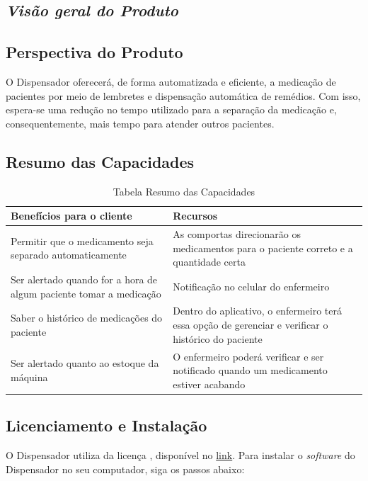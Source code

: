 \begin{apendicesenv}
\section{\textit{Visão geral do Produto}}
\subsection*{Perspectiva do Produto}

O Dispensador oferecerá, de forma automatizada e eficiente, a medicação de pacientes por meio de lembretes e dispensação automática de remédios. Com isso, espera-se uma redução no tempo utilizado para a separação da medicação e, consequentemente, mais tempo para atender outros pacientes.

\subsection*{Resumo das Capacidades}

\begin{table}[H]
    \centering
    \caption{Tabela Resumo das Capacidades}
    \begin{tabularx}{\textwidth}{|G{7.5cm}|G{7.5cm}|}
        \hline
        \textbf{Benefícios para o cliente} & \textbf{Recursos} \\ \hline
        
        Permitir que o medicamento seja separado automaticamente & As comportas direcionarão os medicamentos para o paciente correto e a quantidade certa \\\hline
        
        Ser alertado quando for a hora de algum paciente tomar a medicação & Notificação no celular do enfermeiro \\ \hline
        
        Saber o histórico de medicações do paciente & Dentro do aplicativo, o enfermeiro terá essa opção de gerenciar e verificar o histórico do paciente\\ \hline
        
        Ser alertado quanto ao estoque da máquina & O enfermeiro poderá verificar e ser notificado quando um medicamento estiver acabando\\ \hline
    \end{tabularx}
\end{table}

\subsection*{Licenciamento e Instalação}
O Dispensador utiliza da licença , disponível no  \href{https://opensource.org/licenses/MIT}{link}. Para instalar o \textit{software} do Dispensador no seu computador, siga os passos abaixo:


\end{apendicesenv}
